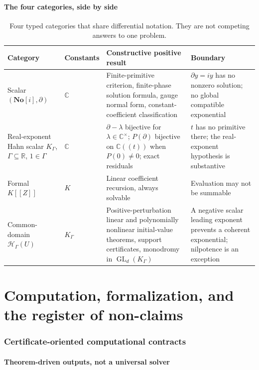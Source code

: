\documentclass[11pt,letterpaper]{article}
\numberwithin{equation}{section}
\theoremstyle{definition}
\theoremstyle{remark}
\newcommand{\SC}{\mathbf{No}[i]}
\newcommand{\R}{\mathbb R}
\newcommand{\C}{\mathbb C}
\newcommand{\der}{\partial}
\newcommand{\Hring}{\mathscr H}
\newcommand{\GL}{\operatorname{GL}}
\begin{document}
\subsection{The four categories, side by side}
\label{diff:sub:fourcategories}

\begin{table}[htbp]
\centering\small
\caption{Four typed categories that share differential notation. They are not
competing answers to one problem.}
\label{diff:tab:categories}
\begin{tabularx}{\textwidth}{@{}L{0.18\textwidth}L{0.11\textwidth}YY@{}}
\toprule
Category & Constants & Constructive positive result & Boundary \\
\midrule
Scalar $(\SC,\der)$ & $\C$ &
Finite-primitive criterion, finite-phase solution formula, gauge normal form,
constant-coefficient classification &
$\der y=iy$ has no nonzero solution; no global compatible exponential \\[0.4em]
Real-exponent Hahn scalar $K_{\Gamma}$, $\Gamma\subseteq\R$, $1\in\Gamma$ &
$\C$ &
$\der-\lambda$ bijective for $\lambda\in\C^{\times}$; $P(\der)$ bijective on
$\C((t))$ when $P(0)\neq0$; exact residuals &
$t$ has no primitive there; the real-exponent hypothesis is substantive \\[0.4em]
Formal $K[[Z]]$ & $K$ &
Linear coefficient recursion, always solvable &
Evaluation may not be summable \\[0.4em]
Common-domain $\Hring_{\Gamma}(U)$ & $K_{\Gamma}$ &
Positive-perturbation linear and polynomially nonlinear initial-value
theorems, support certificates, monodromy in $\GL_{d}(K_{\Gamma})$ &
A negative scalar leading exponent prevents a coherent exponential; nilpotence
is an exception \\
\bottomrule
\end{tabularx}
\end{table}
\part{Computation, formalization, and the register of non-claims}
\label{diff:part:limits}

\section{Certificate-oriented computational contracts}
\label{diff:sec:computation}

\subsection{Theorem-driven outputs, not a universal solver}
\label{diff:sub:certificates}
\end{document}
